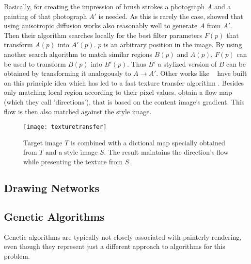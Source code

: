 Basically, for creating the impression of brush strokes a photograph $A$ and a painting of that photograph $A'$ is needed.
As this is rarely the case, \citeauthor*{iamgeanalogies} showed that using anisotropic diffusion works also reasonably well to generate $A$ from $A'$.
Then their algorithm searches locally for the best filter parameters $F(p)$ that transform $A(p)$ into $A'(p)$.
$p$ is an arbitrary position in the image.
By using another search algorithm to match similar regions $B(p)$ and $A(p)$, $F(p)$ can be used to transform $B(p)$ into $B'(p)$.
Thus $B'$ a stylized version of $B$ can be obtained by transforming it analogously to $A \rightarrow A'$.
Other works like \citeauthor*{texturetransfer}~\cite{texturetransfer} have built on this principle idea which has led to a fast texture transfer algorithm \cite{fasttexturetransfer}.
Besides only matching local region according to their pixel values, \citeauthor*{texturetransfer} obtain a flow map (which they call 'directions'), that is based on the content image's gradient.
This flow is then also matched against the style image.
\begin{figure}
    \texttt{[image: texturetransfer]}
    \caption[]{Target image $T$ is combined with a dictional map specially obtained from $T$ and a style image  $S$. The result maintains the direction's flow while presenting the texture from $S$.}
\end{figure}



\subsection{Drawing Networks}





\subsection{Genetic Algorithms}
Genetic algorithms are typically not closely associated with painterly rendering, even though they represent just a different approach to algorithms for this problem.

